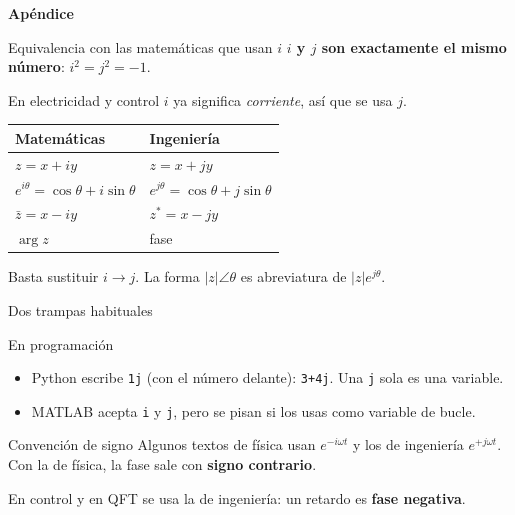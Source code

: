 \documentclass[aspectratio=169,11pt]{beamer}
\begin{document}
\appendix
\begin{frame}
  \centering
  \vspace{1.2cm}
  {\Huge\bfseries Apéndice}
\end{frame}

\begin{frame}{Equivalencia con las matemáticas que usan $i$}
  \textbf{$i$ y $j$ son exactamente el mismo número}: $i^2=j^2=-1$.
  \vspace{4pt}

  En electricidad y control $i$ ya significa \emph{corriente}, así que se usa $j$.
  \vspace{6pt}

  \centering
  \renewcommand{\arraystretch}{1.5}
  \begin{tabular}{ll}
    \hline
    \textbf{Matemáticas} & \textbf{Ingeniería} \\
    \hline
    $z = x + iy$ & $z = x + jy$ \\
    $e^{i\theta} = \cos\theta + i\sin\theta$ & $e^{j\theta} = \cos\theta + j\sin\theta$ \\
    $\bar z = x - iy$ & $z^{*} = x - jy$ \\
    $\arg z$ & fase \\
    \hline
  \end{tabular}
  \vspace{6pt}

  \raggedright
  Basta sustituir $i \to j$. La forma $|z|\angle\theta$ es abreviatura de $|z|e^{j\theta}$.
\end{frame}


\begin{frame}{Dos trampas habituales}
  \begin{block}{En programación}
    \begin{itemize}
      \item Python escribe \texttt{1j} (con el número delante): \texttt{3+4j}. Una \texttt{j} sola es una variable.
      \item MATLAB acepta \texttt{i} y \texttt{j}, pero se pisan si los usas como variable de bucle.
    \end{itemize}
  \end{block}
  \begin{alertblock}{Convención de signo}
    Algunos textos de física usan $e^{-i\omega t}$ y los de ingeniería $e^{+j\omega t}$. Con la de física, la fase sale con \textbf{signo contrario}.

    En control y en QFT se usa la de ingeniería: un retardo es \textbf{fase negativa}.
  \end{alertblock}
\end{frame}
\end{document}
